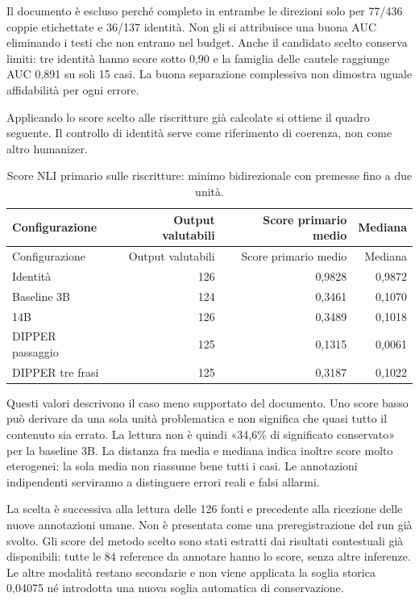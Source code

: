 \documentclass[11pt,a4paper]{article}
\begin{document}
Il documento è escluso perché completo in entrambe le direzioni solo per 77/436 coppie etichettate e 36/137 identità. Non gli si attribuisce una buona AUC eliminando i testi che non entrano nel budget. Anche il candidato scelto conserva limiti: tre identità hanno score sotto 0,90 e la famiglia delle cautele raggiunge AUC 0,891 su soli 15 casi. La buona separazione complessiva non dimostra uguale affidabilità per ogni errore.

Applicando lo score scelto alle riscritture già calcolate si ottiene il quadro seguente. Il controllo di identità serve come riferimento di coerenza, non come altro humanizer.

\begingroup\small\setlength{\tabcolsep}{3pt}
\begin{longtable}[]{@{}lrrr@{}}
\caption{Score NLI primario sulle riscritture: minimo bidirezionale con premesse fino a due unità.}\tabularnewline
\toprule\noalign{}
Configurazione & Output valutabili & Score primario medio & Mediana \\
\midrule\noalign{}
\endfirsthead
\toprule\noalign{}
Configurazione & Output valutabili & Score primario medio & Mediana \\
\midrule\noalign{}
\endhead
\bottomrule\noalign{}
\endlastfoot
Identità & 126 & 0,9828 & 0,9872 \\
Baseline 3B & 124 & 0,3461 & 0,1070 \\
14B & 126 & 0,3489 & 0,1018 \\
DIPPER passaggio & 125 & 0,1315 & 0,0061 \\
DIPPER tre frasi & 125 & 0,3187 & 0,1022 \\
\end{longtable}
\endgroup

Questi valori descrivono il caso meno supportato del documento. Uno score basso può derivare da una sola unità problematica e non significa che quasi tutto il contenuto sia errato. La lettura non è quindi «34,6\% di significato conservato» per la baseline 3B. La distanza fra media e mediana indica inoltre score molto eterogenei: la sola media non riassume bene tutti i casi. Le annotazioni indipendenti serviranno a distinguere errori reali e falsi allarmi.

La scelta è successiva alla lettura delle 126 fonti e precedente alla ricezione delle nuove annotazioni umane. Non è presentata come una preregistrazione del run già svolto. Gli score del metodo scelto sono stati estratti dai risultati contestuali già disponibili: tutte le 84 reference da annotare hanno lo score, senza altre inferenze. Le altre modalità restano secondarie e non viene applicata la soglia storica 0,04075 né introdotta una nuova soglia automatica di conservazione.
\end{document}
